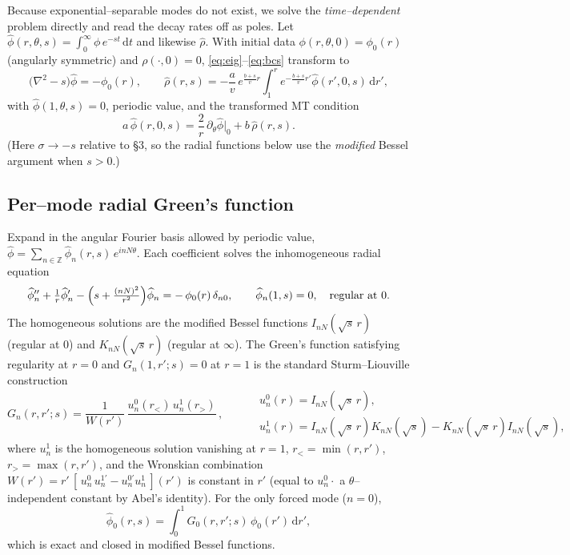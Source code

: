 \documentclass{article}
\newcommand{\rd}{\mathrm{d}}
\begin{document}
Because exponential--separable modes do not exist, we solve the
\emph{time--dependent} problem directly and read the decay rates off as poles.
Let $\widehat\phi(r,\theta,s)=\int_0^\infty \phi\,e^{-st}\,\rd t$ and likewise
$\widehat\rho$. With initial data $\phi(r,\theta,0)=\phi_0(r)$ (angularly
symmetric) and $\rho(\cdot,0)=0$, \eqref{eq:eig}--\eqref{eq:bcs} transform to
\begin{equation}
\bigl(\nabla^{2}-s\bigr)\widehat\phi=-\phi_0(r),
\qquad
\widehat\rho(r,s)=-\frac{a}{v}\,e^{\frac{b+s}{v}r}
\int_1^r e^{-\frac{b+s}{v}r'}\widehat\phi(r',0,s)\,\rd r',
\label{eq:lap}
\end{equation}
with $\widehat\phi(1,\theta,s)=0$, periodic value, and the transformed MT
condition
\begin{equation}
a\,\widehat\phi(r,0,s)=\frac{2}{r}\,\partial_\theta\widehat\phi\big|_{0}
+b\,\widehat\rho(r,s).
\label{eq:lapbc}
\end{equation}
(Here $\sigma\to -s$ relative to \S3, so the radial functions below use the
\emph{modified} Bessel argument when $s>0$.)

\subsection{Per--mode radial Green's function}
Expand in the angular Fourier basis allowed by periodic value,
$\widehat\phi=\sum_{n\in\mathbb Z}\widehat\phi_n(r,s)\,e^{inN\theta}$. Each
coefficient solves the inhomogeneous radial equation
\begin{equation}
\widehat\phi_n''+\tfrac1r\widehat\phi_n'
-\Bigl(s+\tfrac{(nN)^2}{r^2}\Bigr)\widehat\phi_n
=-\,\phi_0(r)\,\delta_{n0},
\qquad
\widehat\phi_n(1,s)=0,\quad \text{regular at }0 .
\label{eq:modeeq}
\end{equation}
The homogeneous solutions are the modified Bessel functions
$I_{nN}(\sqrt{s}\,r)$ (regular at $0$) and $K_{nN}(\sqrt{s}\,r)$ (regular at
$\infty$). The Green's function satisfying regularity at $r=0$ and
$G_n(1,r';s)=0$ at $r=1$ is the standard Sturm--Liouville construction
\begin{equation}
G_n(r,r';s)=
\frac{1}{W(r')}\,
\frac{u_n^{0}(r_<)\,u_n^{1}(r_>)}{}\,,
\qquad
\begin{aligned}
&u_n^{0}(r)=I_{nN}(\sqrt s\,r),\\
&u_n^{1}(r)=I_{nN}(\sqrt s\,r)K_{nN}(\sqrt s)-K_{nN}(\sqrt s\,r)I_{nN}(\sqrt s),
\end{aligned}
\label{eq:green}
\end{equation}
where $u_n^{1}$ is the homogeneous solution vanishing at $r=1$, $r_<=\min(r,r')$,
$r_>=\max(r,r')$, and the Wronskian combination $W(r')=r'\,[\,u_n^{0}\,u_n^{1\prime}-u_n^{0\prime}u_n^{1}\,](r')$
is constant in $r'$ (equal to $u_n^0\!\cdot$ a $\theta$--independent constant by
Abel's identity). For the only forced mode ($n=0$),
\begin{equation}
\widehat\phi_0(r,s)=\int_0^1 G_0(r,r';s)\,\phi_0(r')\,\rd r' ,
\label{eq:phihat0}
\end{equation}
which is exact and closed in modified Bessel functions.
\end{document}
